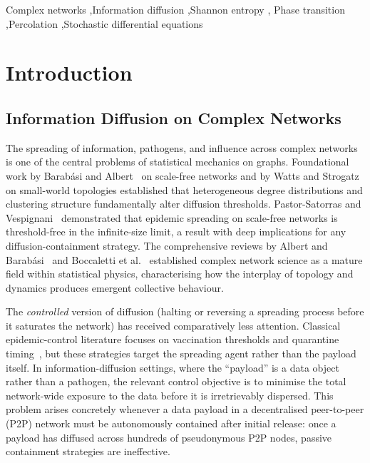 \documentclass[review,12pt]{elsarticle}
\begin{document}
\begin{frontmatter}
\begin{keyword}
Complex networks \sep Information diffusion \sep Shannon entropy \sep
Phase transition \sep Percolation \sep Stochastic differential equations
\end{keyword}

\end{frontmatter}

\section{Introduction}
\label{sec:intro}

\subsection{Information Diffusion on Complex Networks}

The spreading of information, pathogens, and influence across complex networks
is one of the central problems of statistical mechanics on graphs.
Foundational work by Barab\'asi and Albert~\cite{barabasi1999emergence} on
scale-free networks and by Watts and Strogatz~\cite{watts1998collective} on
small-world topologies established that heterogeneous degree distributions and
clustering structure fundamentally alter diffusion thresholds.  Pastor-Satorras
and Vespignani~\cite{pastor2001epidemic} demonstrated that epidemic spreading on
scale-free networks is threshold-free in the infinite-size limit, a result with
deep implications for any diffusion-containment strategy.  The comprehensive
reviews by Albert and Barab\'asi~\cite{albert2002statistical} and Boccaletti
et al.~\cite{boccaletti2006complex} established complex network science as a
mature field within statistical physics, characterising how the interplay of
topology and dynamics produces emergent collective behaviour.

The \emph{controlled} version of diffusion (halting or reversing a spreading
process before it saturates the network) has received comparatively less
attention.  Classical epidemic-control literature focuses on vaccination
thresholds and quarantine timing~\cite{newman2003structure,
dorogovtsev2008critical}, but these strategies target the spreading agent rather
than the payload itself.  In information-diffusion settings, where the
``payload'' is a data object rather than a pathogen, the relevant control
objective is to minimise the total network-wide exposure to the data before
it is irretrievably dispersed.  This problem arises concretely whenever a data
payload in a decentralised peer-to-peer (P2P) network must be autonomously
contained after initial release: once a payload has diffused across hundreds of
pseudonymous P2P nodes, passive containment strategies are ineffective.
\end{document}
